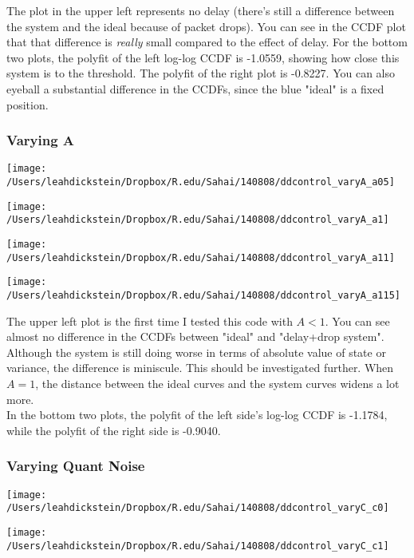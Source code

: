 \documentclass[leqno,twocolumn]{article}
\begin{document}
The plot in the upper left represents no delay (there's still a difference between the system and the ideal because of packet drops). You can see in the CCDF plot that that difference is \textit{really} small compared to the effect of delay. For the bottom two plots, the polyfit of the left log-log CCDF is -1.0559, showing how close this system is to the threshold. The polyfit of the right plot is -0.8227. You can also eyeball a substantial difference in the CCDFs, since the blue "ideal" is a fixed position.

\subsubsection{Varying A}

\begin{minipage}[c]{0.5\textwidth}
\texttt{[image: /Users/leahdickstein/Dropbox/R.edu/Sahai/140808/ddcontrol\_varyA\_a05]}
\end{minipage}
\begin{minipage}[c]{0.5\textwidth}
\texttt{[image: /Users/leahdickstein/Dropbox/R.edu/Sahai/140808/ddcontrol\_varyA\_a1]}
\end{minipage}

\begin{minipage}[c]{0.5\textwidth}
\texttt{[image: /Users/leahdickstein/Dropbox/R.edu/Sahai/140808/ddcontrol\_varyA\_a11]}
\end{minipage}
\begin{minipage}[c]{0.5\textwidth}
\texttt{[image: /Users/leahdickstein/Dropbox/R.edu/Sahai/140808/ddcontrol\_varyA\_a115]}
\end{minipage}

The upper left plot is the first time I tested this code with $A < 1$. You can see almost no difference in the CCDFs between "ideal" and "delay+drop system". Although the system is still doing worse in terms of absolute value of state or variance, the difference is miniscule. This should be investigated further. When $A = 1$, the distance between the ideal curves and the system curves widens a lot more.\\
In the bottom two plots, the polyfit of the left side's log-log CCDF is -1.1784, while the polyfit of the right side is -0.9040.

\subsubsection{Varying Quant Noise}
\begin{minipage}[c]{0.5\textwidth}
\texttt{[image: /Users/leahdickstein/Dropbox/R.edu/Sahai/140808/ddcontrol\_varyC\_c0]}
\end{minipage}
\begin{minipage}[c]{0.5\textwidth}
\texttt{[image: /Users/leahdickstein/Dropbox/R.edu/Sahai/140808/ddcontrol\_varyC\_c1]}
\end{minipage}
\end{document}
